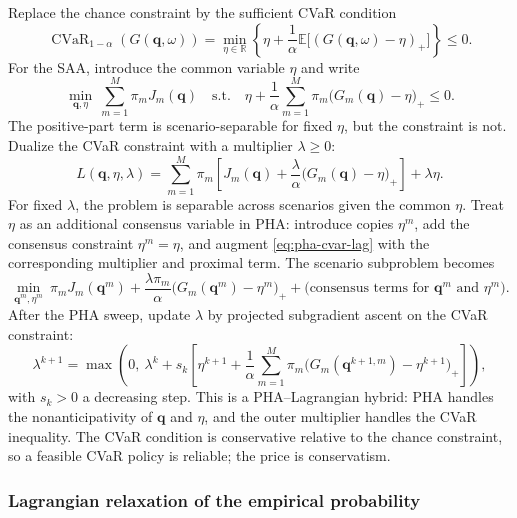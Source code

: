\documentclass[11pt]{article}
\numberwithin{equation}{section}
\newcommand{\R}{\mathbb{R}}
\newcommand{\E}{\mathbb{E}}
\newcommand{\qq}{\mathbf{q}}
\newcommand{\CVaR}{\operatorname{CVaR}}
\theoremstyle{plain}
\begin{document}
Replace the chance constraint by the sufficient CVaR condition
\begin{equation}
\label{eq:pha-cvar}
\CVaR_{1-\alpha}(G(\qq,\omega))
=\min_{\eta\in\R}\left\{
\eta+\frac{1}{\alpha}\E\bigl[(G(\qq,\omega)-\eta)_+\bigr]
\right\}\le0.
\end{equation}
For the SAA, introduce the common variable $\eta$ and write
\begin{equation}
\label{eq:pha-cvar-saa}
\min_{\qq,\eta}\ \sum_{m=1}^{M}\pi_m J_m(\qq)
\quad\text{s.t.}\quad
\eta+\frac{1}{\alpha}\sum_{m=1}^{M}\pi_m
\bigl(G_m(\qq)-\eta\bigr)_+\le0.
\end{equation}
The positive-part term is scenario-separable for fixed $\eta$, but the
constraint is not.  Dualize the CVaR constraint with a multiplier
$\lambda\ge0$:
\begin{equation}
\label{eq:pha-cvar-lag}
L(\qq,\eta,\lambda)
=\sum_{m=1}^{M}\pi_m\left[
J_m(\qq)+\frac{\lambda}{\alpha}
\bigl(G_m(\qq)-\eta\bigr)_+
\right]
+\lambda\eta.
\end{equation}
For fixed $\lambda$, the problem is separable across scenarios given the common
$\eta$.  Treat $\eta$ as an additional consensus variable in PHA: introduce
copies $\eta^m$, add the consensus constraint $\eta^m=\eta$, and augment
\eqref{eq:pha-cvar-lag} with the corresponding multiplier and proximal term.
The scenario subproblem becomes
\begin{equation}
\label{eq:pha-cvar-sub}
\min_{\qq^m,\eta^m}\ 
\pi_m J_m(\qq^m)
+\frac{\lambda\pi_m}{\alpha}\bigl(G_m(\qq^m)-\eta^m\bigr)_+
+\text{(consensus terms for $\qq^m$ and $\eta^m$)}.
\end{equation}
After the PHA sweep, update $\lambda$ by projected subgradient ascent on the
CVaR constraint:
\begin{equation}
\label{eq:pha-lambda}
\lambda^{k+1}
=\max\left(0,\
\lambda^k+s_k\left[
\eta^{k+1}+\frac{1}{\alpha}\sum_{m=1}^{M}\pi_m
\bigl(G_m(\qq^{k+1,m})-\eta^{k+1}\bigr)_+
\right]\right),
\end{equation}
with $s_k>0$ a decreasing step.  This is a PHA--Lagrangian hybrid: PHA handles
the nonanticipativity of $\qq$ and $\eta$, and the outer multiplier handles the
CVaR inequality.  The CVaR condition is conservative relative to the chance
constraint, so a feasible CVaR policy is reliable; the price is conservatism.

\subsubsection{Lagrangian relaxation of the empirical probability}
\end{document}
